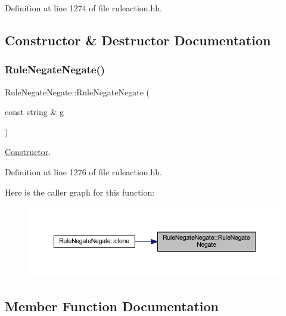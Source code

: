 Definition at line 1274 of file ruleaction.\+hh.



\subsection{Constructor \& Destructor Documentation}
\mbox{\label{class_rule_negate_negate_af88d87dd49213bd59edbe986423418c3}} 
\subsubsection{\texorpdfstring{RuleNegateNegate()}{RuleNegateNegate()}}
{\footnotesize\ttfamily Rule\+Negate\+Negate\+::\+Rule\+Negate\+Negate (\begin{DoxyParamCaption}\item[{const string \&}]{g }\end{DoxyParamCaption})\hspace{0.3cm}{\ttfamily [inline]}}



\mbox{\hyperlink{class_constructor}{Constructor}}. 



Definition at line 1276 of file ruleaction.\+hh.

Here is the caller graph for this function\+:
\nopagebreak
\begin{figure}[H]
\begin{center}
\leavevmode
\includegraphics[width=350pt]{class_rule_negate_negate_af88d87dd49213bd59edbe986423418c3_icgraph}
\end{center}
\end{figure}


\subsection{Member Function Documentation}
\mbox{\label{class_rule_negate_negate_a02dccbffcee07b90e8a7f6aab7bf1ccf}} 
